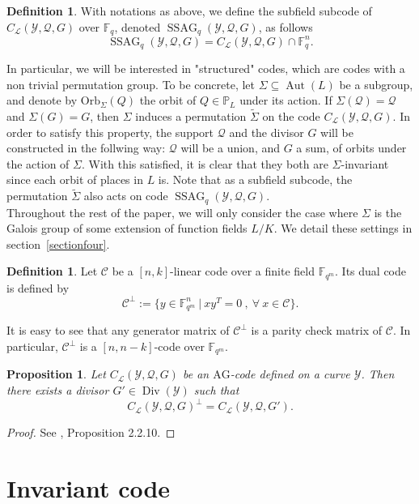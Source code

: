 \documentclass[10pt]{article}
\newtheorem{prop1}[thm]{Proposition}
\theoremstyle{definition}
\theoremstyle{definition}
\theoremstyle{definition}
\newtheorem{def1}[thm]{Definition}
\newcommand{\PP}{\mathbb{P}}
\newcommand{\fqm}{\mathbb{F}_{q^m}}
\newcommand{\fq}{\mathbb{F}_q}
\newcommand{\su}{\subseteq}
\newcommand{\Y}{\mathcal{Y}}
\newcommand{\QR}{\mathcal{Q}}
\newcommand{\Div}{\operatorname{Div}}
\newcommand{\Aut}{\operatorname{Aut}}
\newcommand{\ssag}{\operatorname{SSAG}}
\newcommand{\calL}{\mathcal{L}}
\begin{document}
\begin{def1}
With notations as above, we define the subfield subcode of $C_{\calL}(\Y,\QR,G)$ over $\fq$, denoted $\ssag_q(\Y,\QR,G)$, as follows
\[ \ssag_q(\Y,\QR,G) = C_{\calL}(\Y,\QR,G) \cap \fq^n.\]
\end{def1}

In particular, we will be interested in "structured" codes, which are codes with a non trivial permutation group. To be concrete, let $\Sigma \su \Aut(L)$ be a subgroup, and denote by $\mathrm{Orb}_{\Sigma}(Q)$ the orbit of $Q \in \PP_L$ under its action. If $\Sigma(\QR) = \QR$ and $\Sigma(G)=G$, then $\Sigma$ induces a permutation $\tilde{\Sigma}$ on the code $C_{\calL}(\Y,\QR,G)$. In order to satisfy this property, the support $\QR$ and the divisor $G$ will be constructed in the follwing way: $\QR$ will be a union, and $G$ a sum, of orbits under the action of $\Sigma$. With this satisfied, it is clear that they both are $\Sigma$-invariant since each orbit of places in $L$ is. Note that as a subfield subcode, the permutation $\tilde{\Sigma}$ also acts on code $\ssag_q(\Y,\QR,G)$.\\
Throughout the rest of the paper, we will only consider the case where $\Sigma$ is the Galois group of some extension of function fields $L/K$. We detail these settings in section~\ref{sectionfour}.


\begin{def1}
Let $\mathcal{C}$ be a $[n,k]$-linear code over a finite field $\fqm$. Its dual code is defined by 
\[\mathcal{C}^{\perp} := \{ y \in \fqm^n \ | \ xy^T = 0 \ , \ \forall \ x \in \mathcal{C}\}.\]
\end{def1}
It is easy to see that any generator matrix of $\mathcal{C}^{\perp}$ is a parity check matrix of $\mathcal{C}$. In particular, $\mathcal{C}^{\perp}$ is a $[n,n-k]$-code over $\fqm$.


\begin{prop1} \label{dual}
Let $C_{\calL}(\Y,\QR,G)$ be an $\mathrm{AG}$-code defined on a curve $\Y$. Then there exists a divisor $G' \in \Div(\Y)$ such that 
\[C_{\calL}(\Y,\QR,G)^{\perp} = C_{\calL}(\Y,\QR,G').\]
\end{prop1}

\begin{proof}
See \cite{Sti}, Proposition 2.2.10.
\end{proof}


\section{Invariant code}
\end{document}
